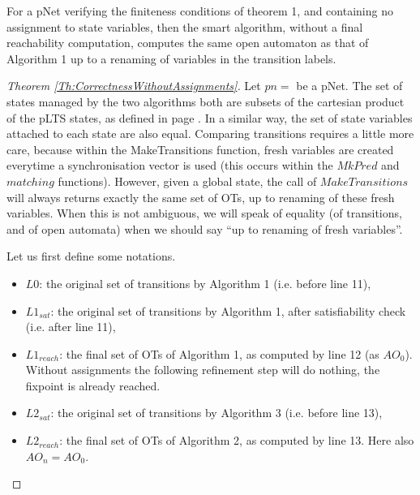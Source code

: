 \documentclass[smallcondensed]{svjour3}
\newcommand{\noteInEM}[2][inline,color=green!40]{\todo[#1]{{\bf Eric: } {#2}}}
\newcommand{\ERIC}[1]{\textcolor{blue}{#1}}
\begin{document}
\begin{theorem}
  \label{Th:CorrectnessWithoutAssignments}
For a pNet verifying the finiteness conditions of theorem 1, and
containing no assignment to state variables, then the smart  
algorithm, without a final reachability computation, computes 
the same open automaton as that of Algorithm 1 up to a renaming of
variables in the transition labels.  
  \end{theorem}


\begin{proof}[Theorem \ref{Th:CorrectnessWithoutAssignments}]

 Let $pn=$ be a pNet. The set of states 
 managed by the two algorithms both are subsets of the cartesian
 product of the pLTS states, as defined in page \pageref{def-states}. In a
 similar way, the set of state variables attached to each state are
 also equal. Comparing  
 transitions requires a little more care, because within the
 MakeTransitions function, fresh variables are created everytime a
 synchronisation vector is used (this occurs within the $MkPred$ and
 $matching$ functions). However, given a global state, the call of
 $MakeTransitions$ will always returns exactly the same set of OTs, up to
renaming of these fresh variables. When this is not ambiguous, we will
speak of equality (of transitions, and of open automata) when we
should say ``up to renaming of fresh variables''.

  Let us first define some notations.
 \begin{itemize}
    \item $L0$: the original set of transitions by Algorithm 1
      (i.e. before line 11), 
    \item $L1_{sat}$:  the original set of transitions by Algorithm 1, after
      satisfiability check (i.e. after line 11),
    \item $L1_{reach}$: the final set of OTs of Algorithm 1, as computed
      by line 12 (as $AO_0$). Without assignments the following
      refinement step will do nothing, the fixpoint is already reached.
    \item $L2_{sat}$: the original set of transitions by Algorithm 3
      (i.e. before line 13), 
    \item $L2_{reach}$: the final set of OTs of Algorithm 2, as computed
          by line 13. Here also $AO_n = AO_0$.
\end{itemize}


\end{proof}
\end{document}

